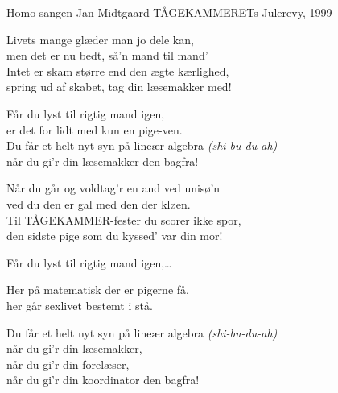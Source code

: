 \begin{song}{Homo-sangen}
  {} %
  {\SBOrgMel} %
  {Jan Midtgaard} %
  {TÅGEKAMMERETs Julerevy, 1999} %
  {\NotCCLIed} %

  \begin{SBVerse}
    Livets mange glæder man jo dele kan,\\
    men det er nu bedt, så'n mand til mand'\\
    Intet er skam større end den ægte kærlighed,\\
    spring ud af skabet, tag din læsemakker med!
  \end{SBVerse}

  \begin{SBChorus}
    Får du lyst til rigtig mand igen,\\
    er det for lidt med kun en pige-ven.\\
    Du får et helt nyt syn på lineær algebra \emph{(shi-bu-du-ah)}\\
    når du gi’r din læsemakker den bagfra!
  \end{SBChorus}

  \begin{SBVerse}
    Når du går og voldtag’r en and ved unisø’n\\
    ved du den er gal med den der kløen.\\
    Til TÅGEKAMMER-fester du scorer ikke spor,\\
    den sidste pige som du kyssed’ var din mor!
  \end{SBVerse}

  \begin{SBChorus}
    Får du lyst til rigtig mand igen,\ldots
  \end{SBChorus}

  \begin{SBSection*}
  Her på matematisk der er pigerne få,\\
  her går sexlivet bestemt i stå.
  \end{SBSection*}

  \begin{SBChorus}
    Du får et helt nyt syn på lineær algebra \emph{(shi-bu-du-ah)}\\
    når du gi’r din læsemakker,\\
    når du gi'r din forelæser,\\
    når du gi'r din koordinator den bagfra!
  \end{SBChorus}
\end{song}